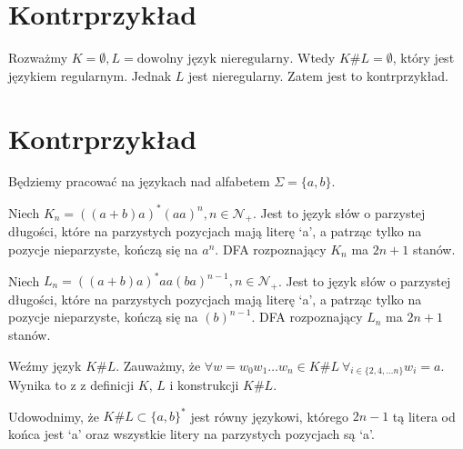 \documentclass{article}
\theoremstyle{definition}
\theoremstyle{remark}
\begin{document}
\section{Kontrprzykład}

Rozważmy \(K = \emptyset, L = \text{dowolny język nieregularny}\). Wtedy \(K \#
L = \emptyset\), który jest językiem regularnym. Jednak \(L\) jest
nieregularny. Zatem jest to kontrprzykład.

\section{Kontrprzykład}

Będziemy pracować na językach nad alfabetem \(\Sigma = \{a, b\}\).

Niech \(K_n = ( (a+b)a )^* (aa)^n, n \in \mathcal{N_+}\). Jest to język słów o
parzystej długości, które na parzystych pozycjach mają literę `a', a patrząc
tylko na pozycje nieparzyste, kończą się na \(a^n\). DFA rozpoznający \(K_n\)
ma \(2n+1\) stanów.





Niech \(L_n = ( (a+b)a )^* aa (ba)^{n-1}, n \in \mathcal{N_+}\). Jest to język
słów o parzystej długości, które na parzystych pozycjach mają literę `a', a
patrząc tylko na pozycje nieparzyste, kończą się na \( (b)^{n-1}\). DFA
rozpoznający \(L_n\) ma \(2n+1\) stanów.

Weźmy język \(K \# L\). Zauważmy, że \( \forall w= w_0 w_1 \ldots w_n \in K \#
L \ \forall_{i \in \{ 2, 4, \ldots n \} } w_i = a\). Wynika to z z definicji
\(K\), \(L\) i konstrukcji \(K \# L\).

Udowodnimy, że \(K \# L \subset \{ a, b \}^*\) jest równy językowi, którego
\(2n-1\) tą litera od końca jest `a' oraz wszystkie litery na parzystych
pozycjach są `a'.
\end{document}
